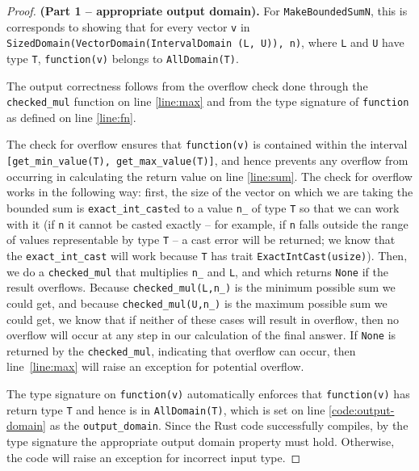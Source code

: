 \documentclass[11pt,a4paper]{article}
\theoremstyle{definition}
\newcommand{\connor}[1]{{ {\color{teal}{(connor)~#1}}}}
\begin{document}
\begin{proof}
    \textbf{(Part 1 -- appropriate output domain).} For \texttt{MakeBoundedSumN}, this is corresponds to showing that for every vector \texttt{v} in \texttt{SizedDomain(VectorDomain(IntervalDomain (L, U)), n)}, where \texttt{L} and \texttt{U} have type \texttt{T}, \texttt{function(v)} belongs to \texttt{AllDomain(T)}.
    
    The output correctness follows from the overflow check done through the \texttt{checked\_mul} function on line \ref{line:max} and from the type signature of \texttt{function} as defined on line \ref{line:fn}.
    
    
    
    The check for overflow ensures that \texttt{function(v)} is contained within the interval \texttt{[get\_min\_value(T), get\_max\_value(T)]}, and hence prevents any overflow from occurring in calculating the return value on line \ref{line:sum}. The check for overflow works in the following way: first, the size of the vector on which we are taking the bounded sum is \texttt{exact\_int\_cast}ed to a value \texttt{n\_} of type \texttt{T} so that we can work with it (if \texttt{n} it cannot be casted exactly -- for example, if \texttt{n} falls outside the range of values representable by type \texttt{T} -- a cast error will be returned; we know that the \texttt{exact\_int\_cast} will work because \texttt{T} has trait \texttt{ExactIntCast(usize)}). Then, we do a \texttt{checked\_mul} that multiplies \texttt{n\_} and \texttt{L}, and which returns \texttt{None} if the result overflows. Because \texttt{checked\_mul(L,n\_)} is the minimum possible sum we could get, and because \texttt{checked\_mul(U,n\_)} is the maximum possible sum we could get, we know that if neither of these cases will result in overflow, then no overflow will occur at any step in our calculation of the final answer. If \texttt{None} is returned by the \texttt{checked\_mul}, indicating that overflow can occur, then line~\ref{line:max} will raise an exception for potential overflow.
    
    The type signature on \texttt{function(v)} automatically enforces that \texttt{function(v)} has return type \texttt{T} and hence is in \texttt{AllDomain(T)}, which is set on line \ref{code:output-domain} as the \texttt{output\_domain}. Since the Rust code successfully compiles, by the type signature the appropriate output domain property must hold. Otherwise, the code will raise an exception for incorrect input type.
    \end{proof}
    
\end{document}
